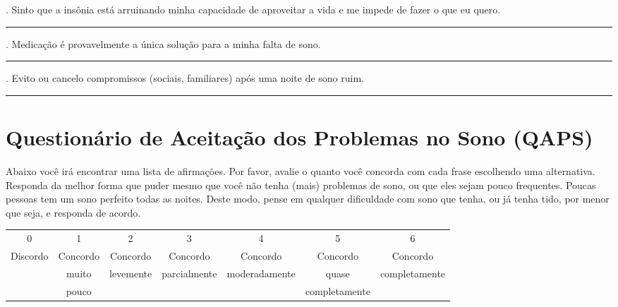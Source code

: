 \begin{appendix}
\begin{flushleft}
{.	Sinto que a insônia está arruinando minha capacidade de aproveitar a vida e me impede de fazer o que eu quero. 
\medskip
\hrule
\medskip
\hspace*{6mm} \par

.	Medicação é provavelmente a única solução para a minha falta de sono.  
\medskip
\hrule
\medskip
\hspace*{6mm} \par

.	Evito ou cancelo compromissos (sociais, familiares) após uma noite de sono ruim.
\medskip
\hrule
\medskip
\hspace*{6mm} \par
}

\end{flushleft}

\section{Questionário de Aceitação dos Problemas no Sono (QAPS)}
\label{qaps}

Abaixo você irá encontrar uma lista de afirmações. Por favor, avalie o quanto você concorda com cada frase escolhendo uma alternativa. Responda da melhor forma que puder mesmo que você não tenha (mais) problemas de sono, ou que eles sejam pouco frequentes. Poucas pessoas tem um sono perfeito todas as noites. Deste modo, pense em qualquer dificuldade com sono que tenha, ou já tenha tido, por menor que seja, e responda de acordo.

\begin{table}[h]
\begin{tabular}{ccccccc}
0 & 1 & 2 & 3 & 4 & 5 & 6 \\
Discordo & Concordo & Concordo & Concordo & Concordo & Concordo & Concordo \\
 & muito & levemente & parcialmente & moderadamente & quase & completamente \\
 & pouco &  &  &  & completamente & 
\end{tabular}
\end{table}


\end{appendix}
